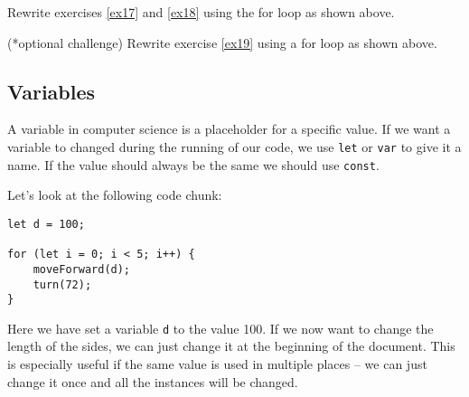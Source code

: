\documentclass[english,11pt,a4paper]{report}
\begin{document}
\begin{ex}
Rewrite exercises \ref{ex17} and \ref{ex18} using the for loop as shown above.
\end{ex}


\begin{ex}
(*optional challenge) Rewrite exercise \ref{ex19} using a for loop as shown above. 
\end{ex}

\subsection{Variables}
A variable in computer science is a placeholder for a specific value. If we want a variable to changed during the running of our code, we use \verb|let| or \verb|var| to give it a name. If the value should always be the same we should use \verb|const|.  


\newpage
Let's look at the following code chunk:
\begin{verbatim}
let d = 100;

for (let i = 0; i < 5; i++) {
	moveForward(d);
	turn(72);
}
\end{verbatim}

Here we have set a variable \verb|d| to the value 100. If we now want to change the length of the sides, we can just change it at the beginning of the document. This is especially useful if the same value is used in multiple places -- we can just change it once and all the instances will be changed.

\end{document}
